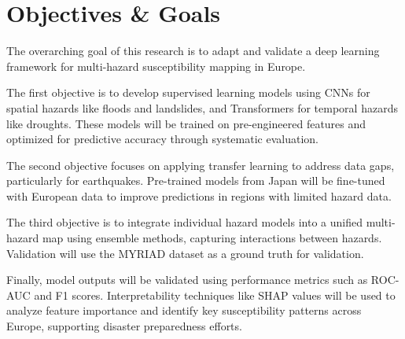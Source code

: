 \section{Objectives \& Goals}
\label{sec:objectives_and_goals}
The overarching goal of this research is to adapt and validate a deep learning framework for multi-hazard susceptibility mapping in Europe. 

The first objective is to develop supervised learning models using CNNs for spatial hazards like floods and landslides, and Transformers for temporal hazards like droughts. These models will be trained on pre-engineered features and optimized for predictive accuracy through systematic evaluation.

The second objective focuses on applying transfer learning to address data gaps, particularly for earthquakes. Pre-trained models from Japan will be fine-tuned with European data to improve predictions in regions with limited hazard data.

The third objective is to integrate individual hazard models into a unified multi-hazard map using ensemble methods, capturing interactions between hazards. Validation will use the MYRIAD dataset as a ground truth for validation.

Finally, model outputs will be validated using performance metrics such as ROC-AUC and F1 scores. Interpretability techniques like SHAP values will be used to analyze feature importance and identify key susceptibility patterns across Europe, supporting disaster preparedness efforts.